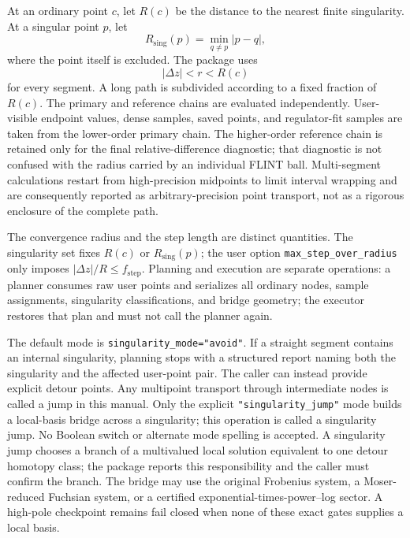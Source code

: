 \documentclass[11pt]{article}
\begin{document}
At an ordinary point $c$, let $R(c)$ be the distance to the nearest finite singularity.  At
a singular point $p$, let
\begin{equation}
 R_{\mathrm{sing}}(p)=\min_{q\ne p}|p-q|,
\end{equation}
where the point itself is excluded.  The package uses
\begin{equation}
  |\Delta z|<r< R(c)
\end{equation}
for every segment.  A long path is subdivided according to a fixed fraction of $R(c)$.  The
primary and reference chains are evaluated independently.  User-visible endpoint values,
dense samples, saved points, and regulator-fit samples are taken from the lower-order primary
chain.  The higher-order reference chain is retained only for the final relative-difference
diagnostic; that diagnostic is not confused with the radius carried by an individual
FLINT ball.  Multi-segment calculations restart from high-precision midpoints to limit
interval wrapping and are consequently reported as arbitrary-precision point transport,
not as a rigorous enclosure of the complete path.

The convergence radius and the step length are distinct quantities.  The singularity set
fixes $R(c)$ or $R_{\mathrm{sing}}(p)$; the user option
\texttt{max\_step\_over\_radius} only imposes
$|\Delta z|/R\leq f_{\mathrm{step}}$.  Planning and execution are separate operations:
a planner consumes raw user points and serializes all ordinary nodes, sample assignments,
singularity classifications, and bridge geometry; the executor restores that plan and must
not call the planner again.

The default mode is \texttt{singularity\_mode="avoid"}.  If a straight segment contains
an internal singularity, planning stops with a structured report naming both the singularity
and the affected user-point pair.  The caller can instead provide explicit detour points.
Any multipoint transport through intermediate nodes is called a jump in this manual.  Only
the explicit \texttt{"singularity\_jump"} mode builds a local-basis bridge across a
singularity; this operation is called a singularity jump.  No Boolean switch or alternate
mode spelling is accepted.  A singularity jump
chooses a branch of a multivalued local solution equivalent to one detour homotopy class;
the package reports this responsibility and the caller must confirm the branch.  The bridge
may use the original Frobenius system, a
Moser-reduced Fuchsian system, or a certified exponential-times-power--log sector.  A
high-pole checkpoint remains fail closed when none of these exact gates supplies a local
basis.
\end{document}
